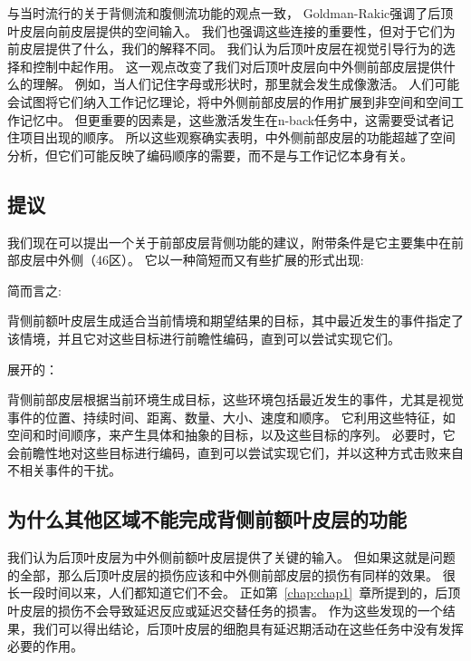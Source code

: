 与当时流行的关于背侧流和腹侧流功能的观点一致\cite{ungerleider1982two}， Goldman-Rakic强调了后顶叶皮层向前皮层提供的空间输入\cite{wilson1993dissociation}。
我们也强调这些连接的重要性，但对于它们为前皮层提供了什么，我们的解释不同。
我们认为后顶叶皮层在视觉引导行为的选择和控制中起作用\cite{shadmehr2004computational,milner2006visual}。
这一观点改变了我们对后顶叶皮层向中外侧前部皮层提供什么的理解\cite{rushworth2000anatomical}。
例如，当人们记住字母或形状时，那里就会发生成像激活\cite{rushworth1998functional}。
人们可能会试图将它们纳入工作记忆理论，将中外侧前部皮层的作用扩展到非空间和空间工作记忆中。
但更重要的因素是，这些激活发生在n-back任务中，这需要受试者记住项目出现的顺序\cite{nystrom2000working}。
所以这些观察确实表明，中外侧前部皮层的功能超越了空间分析，但它们可能反映了编码顺序的需要，而不是与工作记忆本身有关。



\subsection{提议}

我们现在可以提出一个关于前部皮层背侧功能的建议，附带条件是它主要集中在前部皮层中外侧（46区）。
它以一种简短而又有些扩展的形式出现:

简而言之:

背侧前额叶皮层生成适合当前情境和期望结果的目标，其中最近发生的事件指定了该情境，并且它对这些目标进行前瞻性编码，直到可以尝试实现它们。


展开的：

背侧前部皮层根据当前环境生成目标，这些环境包括最近发生的事件，尤其是视觉事件的位置、持续时间、距离、数量、大小、速度和顺序。
它利用这些特征，如空间和时间顺序，来产生具体和抽象的目标，以及这些目标的序列。
必要时，它会前瞻性地对这些目标进行编码，直到可以尝试实现它们，并以这种方式击败来自不相关事件的干扰。



\subsection{为什么其他区域不能完成背侧前额叶皮层的功能}

我们认为后顶叶皮层为中外侧前额叶皮层提供了关键的输入。
但如果这就是问题的全部，那么后顶叶皮层的损伤应该和中外侧前部皮层的损伤有同样的效果。
很长一段时间以来，人们都知道它们不会。
正如第~\ref{chap:chap1}~章所提到的，后顶叶皮层的损伤不会导致延迟反应\cite{alexander1973effects}或延迟交替\cite{ettlinger1966tactile}任务的损害。
作为这些发现的一个结果，我们可以得出结论，后顶叶皮层的细胞具有延迟期活动\cite{kalaska1995deciding,snyder2000intention}在这些任务中没有发挥必要的作用。


